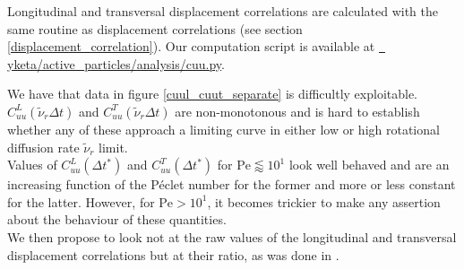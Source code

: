 \documentclass[class=report, float=false, crop=false]{standalone}
\begin{document}

Longitudinal and transversal displacement correlations are calculated with the same routine as displacement correlations (see section \ref{displacement_correlation}). Our computation script is available at \href{https://github.com/yketa/active_particles/blob/master/analysis/cuu.py}{{\faGithub~ yketa/active\_particles/analysis/cuu.py}}.


We have that data in figure \ref{cuul_cuut_separate} is difficultly exploitable. $C_{uu}^L(\tilde{\nu}_r\Delta t)$ and $C_{uu}^T(\tilde{\nu}_r\Delta t)$ are non-monotonous and is hard to establish whether any of these approach a limiting curve in either low or high rotational diffusion rate $\tilde{\nu}_r$ limit.\\

Values of $C_{uu}^L(\Delta t^*)$ and $C_{uu}^T(\Delta t^*)$ for $\text{Pe} \lessapprox 10^1$ look well behaved and are an increasing function of the P\'eclet number for the former and more or less constant for the latter. However, for $\text{Pe} > 10^1$, it becomes trickier to make any assertion about the behaviour of these quantities.\\

We then propose to look not at the raw values of the longitudinal and transversal displacement correlations but at their ratio, as was done in \cite{vasisht2018rate}.
\end{document}
